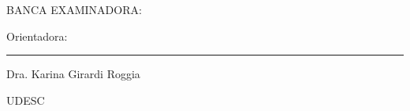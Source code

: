 

%
% 
%
\begin{folhadeaprovacao}



    \begin{center}
        {\selectfont\MakeTextUppercase{\normalsize\imprimirautor}}
    \end{center}
    \vfill

    \vfill
    \begin{center}
        {\selectfont\MakeTextUppercase{\imprimirtitulo}}
    \end{center}
    \vfill


%


\vfill

    \begin{center}
        {\selectfont BANCA EXAMINADORA: }
        \vspace*{1.75cm}
    \end{center}

    {Orientadora:}

    \begin{center}
        \begin{minipage}{8.75cm}
            \begin{flushleft}
                \rule{8.75cm}{0.1mm}

                Dra. Karina Girardi Roggia \par
                UDESC
            \end{flushleft}
        \end{minipage}
    \end{center}


\end{folhadeaprovacao}
